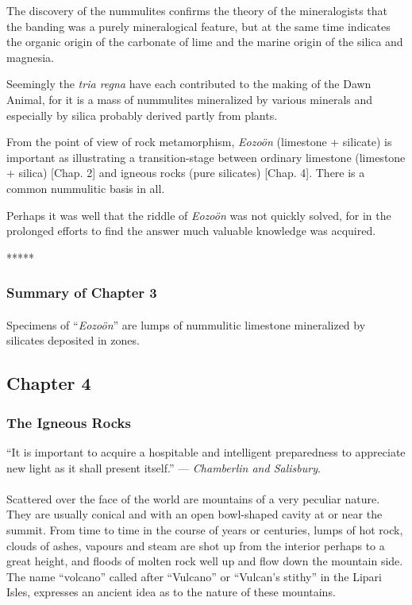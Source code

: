 \documentclass[a4paper, 12pt, oneside]{article}
\begin{document}
The discovery of the nummulites confirms the theory of the mineralogists that the banding was a purely mineralogical feature, but at the same time indicates the organic origin of the carbonate of lime and the marine origin of the silica and magnesia.

Seemingly the \emph{tria regna} have each contributed to the making of the Dawn Animal, for it is a mass of nummulites mineralized by various minerals and especially by silica probably derived partly from plants.

From the point of view of rock metamorphism, \emph{Eozoön} (limestone + silicate) is important as illustrating a transition-stage between ordinary limestone (limestone + silica) [Chap. 2] and igneous rocks (pure silicates) [Chap. 4]. There is a common nummulitic basis in all.

Perhaps it was well that the riddle of \emph{Eozoön} was not quickly solved, for in the prolonged efforts to find the answer much valuable knowledge was acquired.

\centerline{*\hspace{15mm}*\hspace{15mm}*\hspace{15mm}*\hspace{15mm}*}
\bigskip

\subsubsection{Summary of Chapter 3}
\paragraph{}
Specimens of ``\emph{Eozoön}'' are lumps of nummulitic limestone mineralized by silicates deposited in zones.
\clearpage
\subsection{Chapter 4}
\subsubsection{The Igneous Rocks}
\begin{displayquote}
``It is important to acquire a hospitable and intelligent preparedness to appreciate new light as it shall present itself.'' --- \emph{Chamberlin and Salisbury}.
\end{displayquote}
\paragraph{}
Scattered over the face of the world are mountains of a very peculiar nature. They are usually conical and with an open bowl-shaped cavity at or near the summit. From time to time in the course of years or centuries, lumps of hot rock, clouds of ashes, vapours and steam are shot up from the interior perhaps to a great height, and floods of molten rock well up and flow down the mountain side. The name ``volcano'' called after ``Vulcano'' or ``Vulcan's stithy'' in the Lipari Isles, expresses an ancient idea as to the nature of these mountains.
\end{document}
